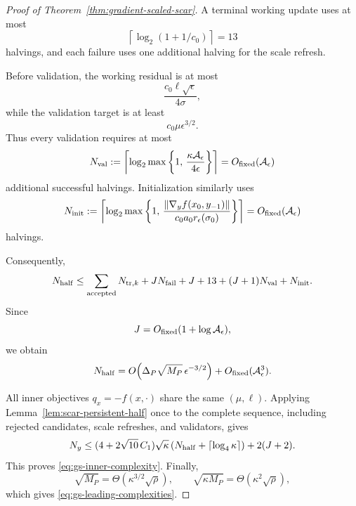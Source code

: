 \begin{proof}[Proof of Theorem~\ref{thm:gradient-scaled-scar}]
A terminal working update uses at most
\[
    \left\lceil
        \log_2(1+1/c_0)
    \right\rceil
    =
    13
\]
halvings, and each failure uses one additional halving for the scale
refresh.

Before validation, the working residual is at most
\[
    \frac{
        c_0\ell\sqrt\epsilon
    }{
        4\sigma
    },
\]
while the validation target is at least
\[
    c_0\mu\epsilon^{3/2}.
\]
Thus every validation requires at most
\[
    N_{\rm val}
    :=
    \left\lceil
        \log_2
        \max\left\{
            1,\,
            \frac{
                \kappa\mathcal A_\epsilon
            }{
                4\epsilon
            }
        \right\}
    \right\rceil
    =
    O_{\rm fixed}(\mathcal A_\epsilon)
\]
additional successful halvings.
Initialization similarly uses
\[
    N_{\rm init}
    :=
    \left\lceil
        \log_2
        \max\left\{
            1,\,
            \frac{
                \|\nabla_yf(x_0,y_{-1})\|
            }{
                c_0a_0r_\epsilon(\sigma_0)
            }
        \right\}
    \right\rceil
    =
    O_{\rm fixed}(\mathcal A_\epsilon)
\]
halvings.

Consequently,
\[
    N_{\rm half}
    \le
    \sum_{\rm accepted}N_{{\rm tr},k}
    +
    JN_{\rm fail}
    +
    J+13
    +
    (J+1)N_{\rm val}
    +
    N_{\rm init}.
\]
Since
\[
    J
    =
    O_{\rm fixed}
    (1+\log\mathcal A_\epsilon),
\]
we obtain
\[
    N_{\rm half}
    =
    O\!\left(
        \Delta_P\sqrt{M_P}\,
        \epsilon^{-3/2}
    \right)
    +
    O_{\rm fixed}
    (\mathcal A_\epsilon^3).
\]

All inner objectives $q_x=-f(x,\cdot)$ share the same
$(\mu,\ell)$.
Applying Lemma~\ref{lem:scar-persistent-half} once to the complete
sequence, including rejected candidates, scale refreshes, and
validators, gives
\begin{equation}
    N_y
    \le
    (4+2\sqrt{10}\,C_1)
    \sqrt\kappa
    \left(
        N_{\rm half}
        +
        \lceil\log_4\kappa\rceil
    \right)
    +
    2(J+2).
    \label{eq:gs-inner-explicit}
\end{equation}
This proves
\eqref{eq:gs-inner-complexity}.
Finally,
\[
    \sqrt{M_P}
    =
    \Theta(\kappa^{3/2}\sqrt\rho),
    \qquad
    \sqrt{\kappa M_P}
    =
    \Theta(\kappa^2\sqrt\rho),
\]
which gives \eqref{eq:gs-leading-complexities}.
\end{proof}